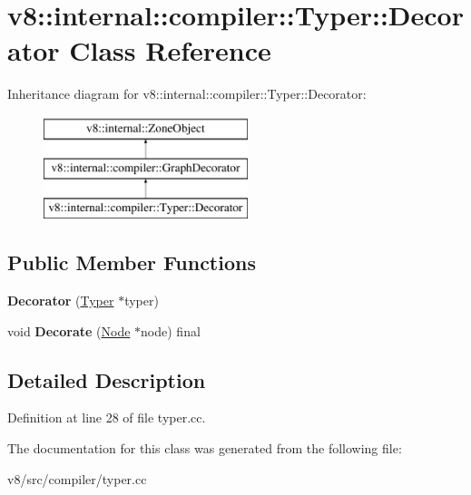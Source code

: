 \hypertarget{classv8_1_1internal_1_1compiler_1_1Typer_1_1Decorator}{}\section{v8\+:\+:internal\+:\+:compiler\+:\+:Typer\+:\+:Decorator Class Reference}
\label{classv8_1_1internal_1_1compiler_1_1Typer_1_1Decorator}
Inheritance diagram for v8\+:\+:internal\+:\+:compiler\+:\+:Typer\+:\+:Decorator\+:\begin{figure}[H]
\begin{center}
\leavevmode
\includegraphics[height=3.000000cm]{classv8_1_1internal_1_1compiler_1_1Typer_1_1Decorator}
\end{center}
\end{figure}
\subsection*{Public Member Functions}
\begin{DoxyCompactItemize}
\item 
\mbox{\label{classv8_1_1internal_1_1compiler_1_1Typer_1_1Decorator_ac58f3ef557f8688066edac72f05040ee}} 
{\bfseries Decorator} (\mbox{\hyperlink{classv8_1_1internal_1_1compiler_1_1Typer}{Typer}} $\ast$typer)
\item 
\mbox{\label{classv8_1_1internal_1_1compiler_1_1Typer_1_1Decorator_a1a7053547003779a009aab5f01524155}} 
void {\bfseries Decorate} (\mbox{\hyperlink{classv8_1_1internal_1_1compiler_1_1Node}{Node}} $\ast$node) final
\end{DoxyCompactItemize}


\subsection{Detailed Description}


Definition at line 28 of file typer.\+cc.



The documentation for this class was generated from the following file\+:\begin{DoxyCompactItemize}
\item 
v8/src/compiler/typer.\+cc\end{DoxyCompactItemize}
